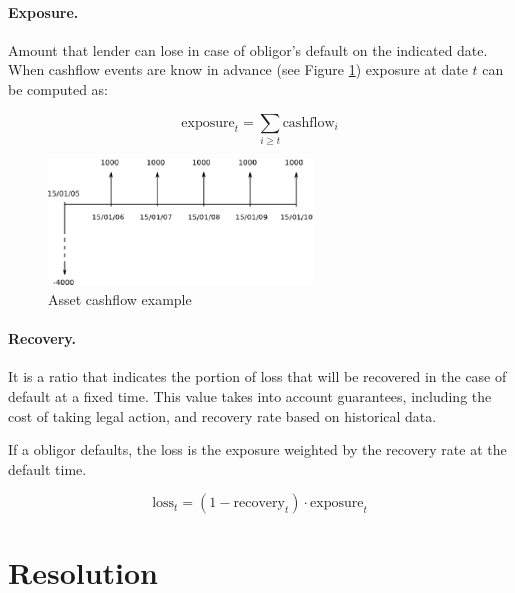 \documentclass[a4paper,12pt,final]{article}
\begin{document}
\paragraph{Exposure.} Amount that lender can lose in case of obligor's default 
on the indicated date. When cashflow events are know in advance (see Figure 
\ref{cashflow}) exposure at date $t$ can be computed as:

\begin{displaymath}
\mathrm{exposure}_{t} = \sum_{i \ge t} \mathrm{cashflow}_{i}
\end{displaymath}

\begin{figure}[!hbt]
\begin{center}
\includegraphics[width=7cm, angle=0]{./images/cashflow.eps}
\caption{Asset cashflow example}
\label{cashflow}
\end{center}
\end{figure}
\FloatBarrier

\paragraph{Recovery.} It is a ratio that indicates the portion of loss that will be recovered
in the case of default at a fixed time. This value takes into account guarantees, including 
the cost of taking legal action, and recovery rate based on historical data.
\newline

If a obligor defaults, the loss is the exposure weighted by the recovery rate at the 
default time.

\begin{displaymath}
\mathrm{loss}_{t} = (1 - \mathrm{recovery}_t) \cdot \mathrm{exposure}_t
\end{displaymath}

\FloatBarrier

\clearpage
\section{Resolution}
\end{document}

